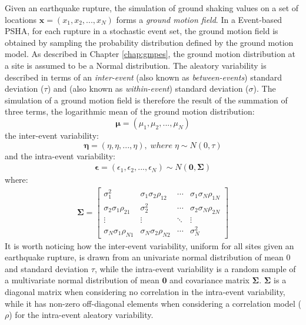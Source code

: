 Given an earthquake rupture, the simulation of ground shaking values on a set of locations $\bm{x}=(x_{1}, x_{2}, ..., x_{N})$
forms a \textit{ground motion field}. In a Event-based PSHA, for each rupture in a stochastic event set,
the ground motion field is obtained by sampling the probability distribution defined by the ground motion model.
As described in Chapter \ref{chap:gmpes}, the ground motion distribution at a site is assumed to be a Normal
distribution. The aleatory variability is described in terms of an \textit{inter-event} (also known as \textit{between-events})
standard deviation ($\tau$) and  (also known as \textit{within-event}) standard deviation ($\sigma$).
The simulation of a ground motion field is therefore the result of the summation of three terms, the logarithmic mean of the
ground motion distribution:
\begin{equation}
\bm\mu = (\mu_{1}, \mu_{2}, ..., \mu_{N})
\end{equation}
the inter-event variability:
\begin{equation}
\bm\eta = (\eta, \eta, ..., \eta),\;where\;\eta\sim N(0, \tau)
\end{equation}
and the intra-event variability:
\begin{align}
\bm\epsilon = (\epsilon_{1}, \epsilon_{2}, ..., \epsilon_{N}) \sim N(\bm{0}, \bm\Sigma)
\end{align}
where:
\begin{align}
\bm\Sigma = 
\begin{bmatrix}
\sigma_{1}^2&\sigma_{1}\sigma_{2}\rho_{12}&\cdots &\sigma_{1}\sigma_{N}\rho_{1N} \\
\sigma_{2}\sigma_{1}\rho_{21}&\sigma_{2}^2&\cdots &\sigma_{2}\sigma_{N}\rho_{2N} \\
\vdots & \vdots & \ddots & \vdots\\
\sigma_{N}\sigma_{1}\rho_{N1}&\sigma_{N}\sigma_{2}\rho_{N2}&\cdots &\sigma_{N}^2
\end{bmatrix}
\end{align}
%
It is worth noticing how the inter-event variability, uniform for all sites
given an earthquake rupture, is drawn from an univariate normal distribution of
mean 0 and standard deviation $\tau$, while the intra-event variability is a
random sample of a multivariate normal distribution of mean $\bm{0}$ and
covariance matrix $\bm\Sigma$.  $\bm\Sigma$ is a diagonal matrix when
considering no correlation in the intra-event variability, while it has non-zero
off-diagonal elements when considering a correlation model ($\rho$) for the
intra-event aleatory variability.
%
%
